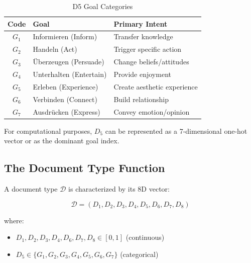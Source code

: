 \begin{table}[htbp]
\centering
\caption{D5 Goal Categories}
\label{tab:d5-goals}
\renewcommand{\arraystretch}{1.3}
\begin{tabular}{@{}cll@{}}
\toprule
\textbf{Code} & \textbf{Goal} & \textbf{Primary Intent} \\
\midrule
$G_1$ & Informieren (Inform) & Transfer knowledge \\
$G_2$ & Handeln (Act) & Trigger specific action \\
$G_3$ & \"Uberzeugen (Persuade) & Change beliefs/attitudes \\
$G_4$ & Unterhalten (Entertain) & Provide enjoyment \\
$G_5$ & Erleben (Experience) & Create aesthetic experience \\
$G_6$ & Verbinden (Connect) & Build relationship \\
$G_7$ & Ausdr\"ucken (Express) & Convey emotion/opinion \\
\bottomrule
\end{tabular}
\end{table}

For computational purposes, $D_5$ can be represented as a 7-dimensional one-hot
vector or as the dominant goal index.

\subsection{The Document Type Function}

\begin{tcolorbox}[colback=gray!5!white, colframe=gray!75!black,
    title=Definition: Document Type Vector]

A document type $\mathcal{D}$ is characterized by its 8D vector:

\begin{equation}
\mathcal{D} = (D_1, D_2, D_3, D_4, D_5, D_6, D_7, D_8)
\end{equation}

where:
\begin{itemize}[nosep]
\item $D_1, D_2, D_3, D_4, D_6, D_7, D_8 \in [0, 1]$ (continuous)
\item $D_5 \in \{G_1, G_2, G_3, G_4, G_5, G_6, G_7\}$ (categorical)
\end{itemize}

\end{tcolorbox}


